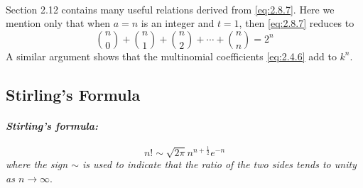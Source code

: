 \documentclass{article}
\numberwithin{equation}{subsection}
\begin{document}
			\paragraph{} Section 2.12 contains many useful relations derived from \eqref{eq:2.8.7}. Here we mention only that when $a=n$ is an integer and $t=1$, then \eqref{eq:2.8.7} reduces to 
			\begin{equation}
			\label{eq:2.8.12}
			{n\choose 0} + {n\choose 1} + {n \choose 2} + \cdots + {n\choose n} = 2^n
			\end{equation}
			A similar argument shows that the multinomial coefficients \eqref{eq:2.4.6} add to $k^n$.
		\subsection{Stirling's Formula}
			\paragraph{\textit{Stirling's formula:}}  
			\begin{equation}
				\label{eq:2.9.1}
				n!\sim\sqrt{2\pi}n^{n+\frac{1}{2}}e^{-n}
			\end{equation}
			\textit{where the sign $\sim$ is used to indicate that the ratio of the two sides tends to unity as $n\rightarrow \infty$}.
\end{document}
